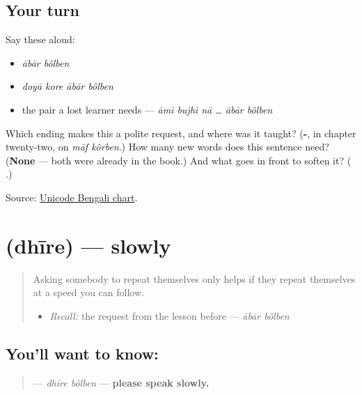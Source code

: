 \subsection*{Your turn}
Say these aloud:

\begin{itemize}
\raggedright
  \item \emph{ābār bôlben}
  \item \emph{doyā kore ābār bôlben}
  \item the pair a lost learner needs — \emph{āmi bujhi nā … ābār bôlben}
\end{itemize}

\begin{tcolorbox}[breakable,colback=teal!4,colframe=teal!35!black,title={Before you move on}]
Which ending makes this a polite request, and where was it taught? (\textbf{-}, in chapter twenty-two, on \emph{māf kôrben}.) How many new words does this sentence need? (\textbf{None} — both were already in the book.) And what goes in front to soften it? (\textbf{ }.)

Source: \href{https://www.unicode.org/charts/PDF/U0980.pdf}{Unicode Bengali chart}.
\end{tcolorbox}
\section[\texorpdfstring{\bn{ধীরে} (dhīre)}{ধীরে (dhīre)}]{ (dhīre) — slowly}

\label{lesson:BN-C19-dhire}



\begin{quote}
Asking somebody to repeat themselves only helps if they repeat themselves at a speed you can follow.

\begin{itemize}
\raggedright
  \item \emph{Recall:} the request from the lesson before — \emph{ābār bôlben}
\end{itemize}
\end{quote}

\subsection*{You'll want to know: }
\begin{quote}
\textbf{ } — \emph{dhīre bôlben} — \textbf{please speak slowly.}
\end{quote}

